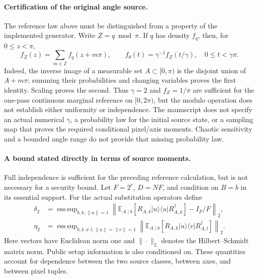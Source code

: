 {\color{red}
\paragraph{Certification of the original angle source.}
The reference law above must be distinguished from a property of the
implemented generator. Write $Z=q\bmod\pi$. If $q$ has density $f_q$,
then, for $0\leq z<\pi$,
\begin{equation}
 f_Z(z)=\sum_{m\in\mathbb Z}f_q(z+m\pi),\qquad
 f_\theta(t)=\gamma^{-1}f_Z(t/\gamma),\quad 0\leq t<\gamma\pi.
 \label{eq:qef_wrapped_source_density}
\end{equation}
Indeed, the inverse image of a measurable set $A\subset[0,\pi)$ is
the disjoint union of $A+m\pi$; summing their probabilities and changing
variables proves the first identity. Scaling proves the second.
Thus $\gamma=2$ and $f_Z=1/\pi$ are sufficient for the one-pass
continuous marginal reference on $[0,2\pi)$, but the modulo operation
does not establish either uniformity or independence. The manuscript
does not specify an actual numerical $\gamma$, a probability law for the
initial source state, or a sampling map that proves the required
conditional pixel/axis moments. Chaotic sensitivity and a bounded angle
range do not provide that missing probability law.

\paragraph{A bound stated directly in terms of source moments.}
Full independence is sufficient for the preceding reference calculation,
but is not necessary for a security bound. Let $F=2^r$, $D=NF$, and
condition on $B=b$ in its essential support. For the actual substitution
operators define
\begin{align}
 \delta_2&=\mathop{\mathrm{ess\,sup}}_{b,k,\|u\|=1}
 \left\|\mathbb E_{A\mid b}
 [R_{A,k}|u\rangle\langle u|R_{A,k}^{\dagger}]-I_F/F\right\|_2,
 \label{eq:qef_actual_diagonal_moment}\\
 \eta_2&=\mathop{\mathrm{ess\,sup}}_{b,k\ne l,\|u\|=\|v\|=1}
 \left\|\mathbb E_{A\mid b}
 [R_{A,k}|u\rangle\langle v|R_{A,l}^{\dagger}]\right\|_2.
 \label{eq:qef_actual_cross_moment}
\end{align}
Here vectors have Euclidean norm one and $\|\cdot\|_2$ denotes the
Hilbert--Schmidt matrix norm. Public setup information is also conditioned
on. These quantities account for dependence between
the two source classes, between axes, and between pixel tuples.

}

